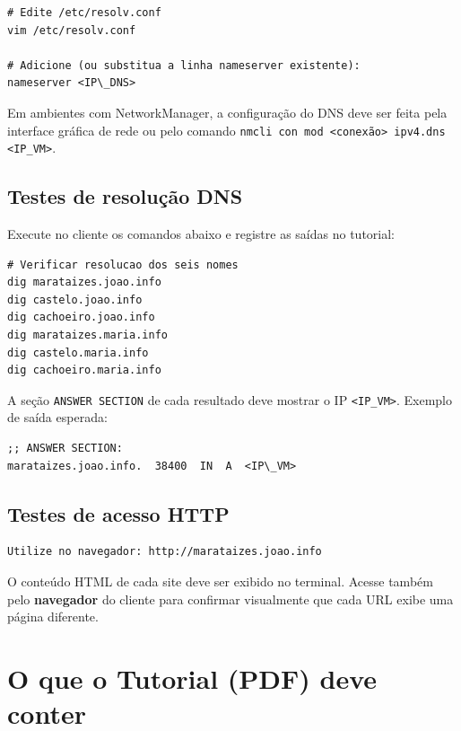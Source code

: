 \documentclass[11pt,a4paper]{article}
\begin{document}
\begin{lstlisting}[style=bash]
# Edite /etc/resolv.conf
vim /etc/resolv.conf

# Adicione (ou substitua a linha nameserver existente):
nameserver <IP\_DNS>
\end{lstlisting}

\begin{infobox}
  Em ambientes com NetworkManager, a configuração do DNS deve ser feita pela interface gráfica de rede ou pelo comando \texttt{nmcli con mod <conexão> ipv4.dns <IP\_VM>}.
\end{infobox}

\subsection{Testes de resolução DNS}

Execute no cliente os comandos abaixo e registre as saídas no tutorial:

\begin{lstlisting}[style=bash]
# Verificar resolucao dos seis nomes
dig marataizes.joao.info
dig castelo.joao.info
dig cachoeiro.joao.info
dig marataizes.maria.info
dig castelo.maria.info
dig cachoeiro.maria.info
\end{lstlisting}

A seção \texttt{ANSWER SECTION} de cada resultado deve mostrar o IP \texttt{<IP\_VM>}.
Exemplo de saída esperada:

\begin{lstlisting}[style=conf]
;; ANSWER SECTION:
marataizes.joao.info.  38400  IN  A  <IP\_VM>
\end{lstlisting}

\subsection{Testes de acesso HTTP}

\begin{lstlisting}[style=bash]
Utilize no navegador: http://marataizes.joao.info
\end{lstlisting}

O conteúdo HTML de cada site deve ser exibido no terminal. Acesse também pelo \textbf{navegador} do cliente para confirmar visualmente que cada URL exibe uma página diferente.

\section{O que o Tutorial (PDF) deve conter}
\end{document}
